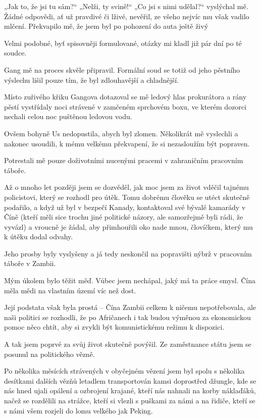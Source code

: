 „Jak to, že jsi tu sám?“ „Nelži, ty svině!“ „Co jsi s nimi udělal?“ vyslýchal mě. Žádné odpovědi, ať už pravdivé či lživé, nevěřil, ze všeho nejvíc mu však vadilo mlčení. Překvapilo mě, že jsem byl po pohození do auta ještě živý

Velmi podobné, byť spisovněji formulované, otázky mi kladl již pár dní po té soudce.

 Gang mě na proces skvěle připravil. Formální soud se totiž od jeho pěstního výslechu lišil pouze tím, že byl zdlouhavější a chladnější.

 Místo zuřivého křiku Gangova dotazoval se mě ledový hlas prokurátora a rány pěstí vystřídaly noci strávené v zamčeném sprchovém boxu, ve kterém dozorci nechali celou noc puštěnou ledovou vodu. 

 Ovšem bohyně Us nedopustila, abych byl zlomen. Několikrát mě vyslechli a nakonec usoudili, k mému velkému překvapení, že si nezasloužím být popraven.

Potrestali mě pouze doživotními nucenými pracemi v zahraničním pracovním táboře.

Až o mnoho let později jsem se dozvěděl, jak moc jsem za život vděčil tajnému policistovi, který se rozhodl pro útěk. Tomu dobrému člověku se utéct skutečně podařilo, a když už byl v bezpečí Kanady, kontaktoval své bývalé kamarády v Číně (kteří měli sice trochu jiné politické názory, ale samozřejmě byli rádi, že vyvázl) a vroucně je žádal, aby přimhouřili oko nade mnou, človíčkem, který mu k útěku dodal odvahy.

 Jeho prosby byly vyslyšeny a já tedy neskončil na popravišti nýbrž v pracovním táboře v Zambii.

 Mým úkolem bylo těžit měď. Vůbec jsem nechápal, jaký má ta práce smysl. Čína měla mědi na vlastním území víc než dost.

 Její podstata však byla prostá – Čína Zambii celkem k ničemu nepotřebovala, ale naši politici se rozhodli, že po Afričanech i tak budou výměnou za ekonomickou pomoc něco chtít, aby si zvykli být komunistickému režimu k dispozici.

A tak jsem poprvé za svůj život skutečně povýšil. Ze zaměstnance státu jsem se posunul na politického vězně. 

Po několika měsících strávených v obyčejném vězení jsem byl spolu s několika desítkami dalších vězňů letadlem transportován kamsi doprostřed džungle, kde se nás hned ujali opálení a ozbrojení krajané, kteří nás nahnali na korby náklaďáků, načež se rozdělili na strážce, kteří si vlezli s puškami za námi a na řidiče, kteří se s námi všem rozjeli do lomu velkého jak Peking.

